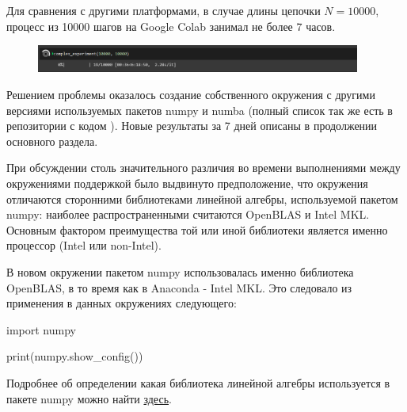 Для сравнения с другими платформами, в случае длины цепочки $N=10000$, процесс из 10000 шагов на Google Colab занимал не более 7 часов.

\begin{figure}[h]
    \centering
    \includegraphics[width=0.95\textwidth]{Sections/Images_2/experiment_time.png}
\end{figure}

Решением проблемы оказалось создание собственного окружения с другими версиями используемых пакетов numpy и numba (полный список так же есть в репозитории с кодом \cite{web:ProjectMagnetRepos}). Новые результаты за 7 дней описаны в продолжении основного раздела.

При обсуждении столь значительного различия во времени выполнениями между окружениями поддержкой было выдвинуто предположение, что окружения отличаются сторонними библиотеками линейной алгебры, используемой пакетом numpy: наиболее распространенными считаются OpenBLAS и Intel MKL. Основным фактором преимущества той или иной библиотеки является именно процессор (Intel или non-Intel). 

В новом окружении пакетом numpy использовалась именно библиотека OpenBLAS, в то время как в Anaconda - Intel MKL. Это следовало из применения в данных окружениях следующего:

\begin{code}
import numpy

print(numpy.show\_config())
\end{code}

Подробнее об определении какая библиотека линейной алгебры используется в пакете numpy можно найти \href{https://shaalltime.medium.com/benchmark-numpy-with-openblas-and-mkl-library-on-amd-ryzen-3950x-cpu-96184f91057f}{здесь}. 
